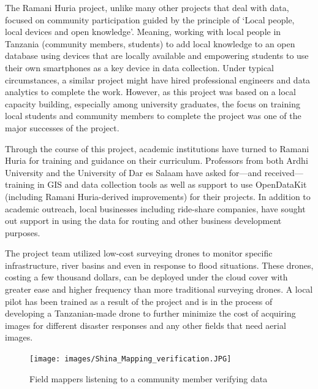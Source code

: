 \documentclass[a4paper,12pt,twoside]{article}
\begin{document}
\begin{multicols}{2}

The Ramani Huria project, unlike many other projects that deal with data, focused on community participation guided by the principle of ‘Local people, local devices and open knowledge'. Meaning,  working with local people in Tanzania (community members, students) to add local knowledge to an open database using devices that are locally available and empowering students to use  their own smartphones as a key device in data collection. Under typical circumstances, a similar project might have hired professional engineers and data analytics to complete the work. However, as this project was based on a local capacity building, especially among university graduates, the focus on training local students and community members to complete the project was one of the major successes of the project.

Through the course of this project, academic institutions have turned to Ramani Huria for training and guidance on their curriculum. Professors from both Ardhi University and the University of Dar es Salaam have asked for—and received—training in GIS and data collection tools as well as support to use OpenDataKit (including Ramani Huria-derived improvements) for their projects. In addition to academic outreach, local businesses including ride-share companies, have sought out support in using the data for routing and other business development purposes. 

The project team utilized low-cost surveying drones to monitor specific infrastructure, river basins and even in response to flood situations. These drones, costing a few thousand dollars, can be deployed under the cloud cover with greater ease and higher frequency than more traditional surveying drones.   A local pilot has been trained as a result of the project and is in the process of developing a Tanzanian-made drone to further minimize the cost of acquiring images for different disaster responses and any other fields that need aerial images.
\end{multicols}
\begin{figure}[h]
    \centering
    \texttt{[image: images/Shina\_Mapping\_verification.JPG]}
    \caption{Field mappers listening to a community member verifying data}
\end{figure}
\end{document}
